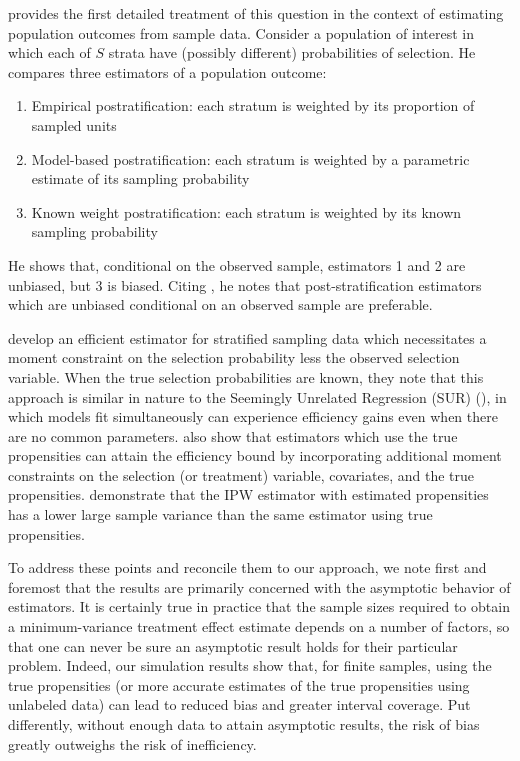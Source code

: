 \documentclass[aos]{imsart}
\begin{document}
\cite{rosenbaum1987model} provides the first detailed treatment of this question in the context of estimating population outcomes from sample data. 
Consider a population of interest in which each of $S$ strata have (possibly different) probabilities of selection. He compares three estimators of a population outcome:
\begin{enumerate}
\item Empirical postratification: each stratum is weighted by its proportion of sampled units
\item Model-based postratification: each stratum is weighted by a parametric estimate of its sampling probability
\item Known weight postratification: each stratum is weighted by its known sampling probability
\end{enumerate} 
He shows that, conditional on the observed sample, estimators 1 and 2 are unbiased, but 3 is biased. Citing \cite{holt1979post}, he notes that post-stratification estimators 
which are unbiased conditional on an observed sample are preferable.

\cite{imbens1996efficient} develop an efficient estimator for stratified sampling data which necessitates a moment constraint on the selection probability less the observed 
selection variable. When the true selection probabilities are known, they note that this approach is similar in nature to the Seemingly Unrelated Regression (SUR) 
(\cite{zellner1963estimators}), in which models fit simultaneously can experience efficiency gains even when there are no common parameters. 
\cite{hirano2003efficient} also show that estimators which use the true propensities can attain the efficiency bound by incorporating additional moment constraints on 
the selection (or treatment) variable, covariates, and the true propensities. \cite{lunceford2004stratification} demonstrate that the IPW estimator 
with estimated propensities has a lower large sample variance than the same estimator using true propensities. 

To address these points and reconcile them to our approach, we note first and foremost that the results are primarily concerned with the asymptotic behavior of estimators. 
It is certainly true in practice that the sample sizes required to obtain a minimum-variance treatment effect estimate depends on a number of factors, so that one can never 
be sure an asymptotic result holds for their particular problem. 
Indeed, our simulation results show that, for finite samples, using the true propensities (or more accurate estimates of the true propensities using unlabeled data) can lead 
to reduced bias and greater interval coverage. Put differently, without enough data to attain asymptotic results, the risk of bias greatly outweighs the risk of inefficiency.
\end{document}
